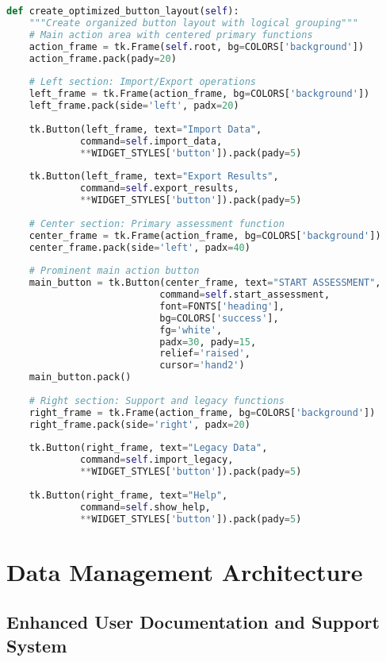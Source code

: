 \documentclass[binding=0.6cm]{sapthesis}
\begin{document}
\begin{lstlisting}[language=Python, caption=Enhanced Button Layout Implementation]
def create_optimized_button_layout(self):
    """Create organized button layout with logical grouping"""
    # Main action area with centered primary functions
    action_frame = tk.Frame(self.root, bg=COLORS['background'])
    action_frame.pack(pady=20)
    
    # Left section: Import/Export operations
    left_frame = tk.Frame(action_frame, bg=COLORS['background'])
    left_frame.pack(side='left', padx=20)
    
    tk.Button(left_frame, text="Import Data", 
             command=self.import_data,
             **WIDGET_STYLES['button']).pack(pady=5)
    
    tk.Button(left_frame, text="Export Results", 
             command=self.export_results,
             **WIDGET_STYLES['button']).pack(pady=5)
    
    # Center section: Primary assessment function
    center_frame = tk.Frame(action_frame, bg=COLORS['background'])
    center_frame.pack(side='left', padx=40)
    
    # Prominent main action button
    main_button = tk.Button(center_frame, text="START ASSESSMENT",
                           command=self.start_assessment,
                           font=FONTS['heading'],
                           bg=COLORS['success'],
                           fg='white',
                           padx=30, pady=15,
                           relief='raised',
                           cursor='hand2')
    main_button.pack()
    
    # Right section: Support and legacy functions
    right_frame = tk.Frame(action_frame, bg=COLORS['background'])
    right_frame.pack(side='right', padx=20)
    
    tk.Button(right_frame, text="Legacy Data", 
             command=self.import_legacy,
             **WIDGET_STYLES['button']).pack(pady=5)
    
    tk.Button(right_frame, text="Help", 
             command=self.show_help,
             **WIDGET_STYLES['button']).pack(pady=5)
\end{lstlisting}

\section{Data Management Architecture}

\subsection{Enhanced User Documentation and Support System}
\end{document}
